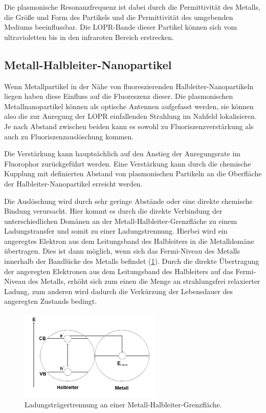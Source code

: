    Die plasmonische Resonanzfrequenz ist dabei durch die Permittivität des Metalls, die Größe und Form des Partikels und die Permittivität des umgebenden Mediums beeinflussbar. \autocite{Kelly2003,Mock2003}
    Die LOPR-Bande dieser Partikel können sich vom ultravioletten bis in den infraroten Bereich erstrecken. \autocite{Haes2004}
    
    \subsection{Metall-Halbleiter-Nanopartikel}
    Wenn Metallpartikel in der Nähe von fluoreszierenden Halbleiter-Nanopartikeln liegen haben diese Einfluss auf die Fluoreszenz dieser.
    Die plasmonischen Metallnanopartikel können als optische Antennen aufgefasst werden, sie können also die zur Anregung der LOPR einfallenden Strahlung im Nahfeld lokalisieren. 
    Je nach Abstand zwischen beiden kann es sowohl zu Fluoriszenzverstärkung als auch zu Fluoriszenzauslöschung kommen. \autocite{Kulakovich2002,Viste2010}
    
    Die Verstärkung kann hauptsächlich auf den Anstieg der Anregungsrate im Fluorophor zurückgeführt werden.\autocite{Chen2008}
    Eine Verstärkung kann durch die chemische Kupplung mit definierten Abstand von plasmonischen Partikeln an die Oberfläche der Halbleiter-Nanopartikel erreicht werden.\autocite{Lee2004}
    
    Die Auslöschung wird durch sehr geringe Abstände oder eine direkte chemische Bindung verursacht.\autocite{Costi2010}
    Hier kommt es durch die direkte Verbindung der unterschiedlichen Domänen an der Metall-Halbleiter-Grenzfläche zu einem Ladungstransfer und somit zu einer Ladungstrennung.
    Hierbei wird ein angeregtes Elektron aus dem Leitungsband des Halbleiters in die Metalldomäne übertragen.
    Dies ist dann möglich, wenn sich das Fermi-Niveau des Metalls innerhalb der Bandlücke des Metalls befindet (\cref{fig:Ladungstrennung}).
    Durch die direkte Übertragung der angeregten Elektronen aus dem Leitungsband des Halbleiters auf das Fermi-Niveau des Metalls, erhöht sich zum einen die Menge an strahlungsfrei relaxierter Ladung, zum anderen wird dadurch die Verkürzung der Lebensdauer des angeregten Zustands bedingt.\autocite{Banin2014}
    \begin{figure}[H]
    	\centering
    	\includegraphics[width=0.6\textwidth]{Bilder/HL-M} 	
    	\caption{Ladungsträgertrennung an einer Metall-Halbleiter-Grenzfläche.}
    	\label{fig:Ladungstrennung}
    \end{figure}
    
